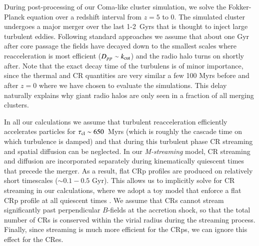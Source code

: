 \documentclass[fleqn,usenatbib,useAMS]{mnras}
\newcommand{\Mstream}{{\it M-streaming}\xspace}
\begin{document}
During post-processing of our Coma-like cluster simulation, we solve
the Fokker-Planck equation over a redshift interval from $z=5$ to
0. The simulated cluster undergoes a major merger over the last
1-2~Gyrs that is thought to inject large turbulent eddies. Following
standard approaches
\citep{brunetti07,brunetti11,2004ApJ...614..757Y,miniati15}
we assume that about one Gyr after core passage the fields have
decayed down to the smallest scales where reacceleration is most
efficient ($D_{pp}\sim k_{\mathrm{cut}}$) and the radio halo turns on
shortly after. Note that the exact decay time of the turbulens is of
minor importance, since the thermal and CR quantities are very similar
a few 100 Myrs before and after $z=0$ where we have chosen to evaluate
the simulations. This delay naturally explains why giant radio halos
are only seen in a fraction of all merging clusters.

In all our calculations we assume that turbulent reacceleration
efficiently accelerates particles for $\tau_{\mathrm{cl}}\sim650$~Myrs
(which is roughly the cascade time on which turbulence is damped) and
that during this turbulent phase CR streaming and spatial diffusion
can be neglected. In our \Mstream model, CR streaming and diffusion
are incorporated separately during kinematically quiescent times that
precede the merger. As a result, flat CRp profiles are produced on
relatively short timescales ($\sim 0.1-0.5$ Gyr). This allows us to
implicitly solve for CR streaming in our calculations, where we adopt
a toy model that enforce a flat CRp profile at all quiescent times
\citep{wiener13}. We assume that CRs cannot stream significantly past
perpendicular $B$-fields at the accretion shock, so that the total
number of CRs is conserved within the virial radius during the
streaming process. Finally, since streaming is much more efficient for
the CRps, we can ignore this effect for the CRes.
\end{document}
